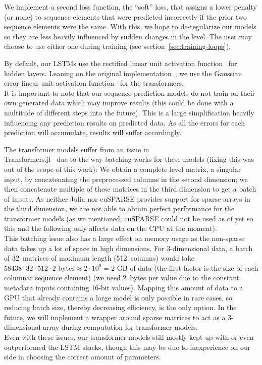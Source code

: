 We implement a second loss function, the ``soft'' loss, that assigns a
lower penalty (or none) to sequence elements that were predicted
incorrectly if the prior two sequence elements were the same. With
this, we hope to de-regularize our models so they are less heavily
influenced by sudden changes in the level. The user may choose to use
either one during training (see section~\ref{sec:training-loops}).

By default, our LSTMs use the rectified linear unit activation
function~\cite{nairRectifiedLinearUnits,RectifierNeuralNetworks2019}
for hidden layers. Leaning on the original
implementation~\cite{OpenaiGpt22019}, we use the Gaussian error linear
unit activation function~\cite{hendrycksGaussianErrorLinear2018} for
the transformers. \\
It is important to note that our sequence prediction models do not
train on their own generated data which may improve results (this
could be done with a multitude of different steps into the future).
This is a large simplification heavily influencing any prediction
results on predicted data. As all the errors for each prediction will
accumulate, results will suffer accordingly.

The transformer models suffer from an issue in \\
\mbox{Transformers.jl}~\cite{peterChengchingwenTransformersJl2019} due
to the way batching works for these models (fixing this was out of the
scope of this work): We obtain a complete level matrix, a singular
input, by concatenating the preprocessed columns in the second
dimension; we then concatenate multiple of these matrices in the third
dimension to get a batch of inputs. As neither Julia nor
\mbox{cuSPARSE} provides support for sparse arrays in the third
dimension, we are not able to obtain perfect performance for the
transformer models (as we mentioned, \mbox{cuSPARSE} could not be used
as of yet so this and the following only affects data on the CPU at
the moment). \\
This batching issue also has a large effect on memory usage as the
non-sparse data takes up a lot of space in high dimensions. For
3-dimensional data, a batch of 32~matrices of maximum length
(512~columns) would take
$58438 \cdot 32 \cdot 512 \cdot 2\text{ bytes} \approx 2 \cdot 10^{9} = 2\text{ GB}$ of data
(the first factor is the size of each columnar sequence element) (we
need 2~bytes per value due to the constant metadata inputs containing
16-bit values). Mapping this amount of data to a GPU that already
contains a large model is only possible in rare cases, so reducing
batch size, thereby decreasing efficiency, is the only option. In the
future, we will implement a wrapper around sparse matrices to act as a
3-dimensional array during computation for transformer models. \\
Even with these issues, our transformer models still mostly kept up
with or even outperformed the LSTM stacks, though this may be due to
inexperience on our side in choosing the correct amount of parameters.

